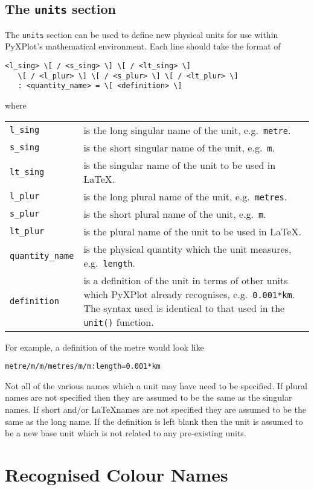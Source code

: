 \subsection{The {\tt units} section}
\label{sec:configfile_units}

The {\tt units} section can be used to define new physical units for use within
PyXPlot's mathematical environment. Each line should take the format of
\begin{verbatim}
<l_sing> \[ / <s_sing> \] \[ / <lt_sing> \] 
   \[ / <l_plur> \] \[ / <s_plur> \] \[ / <lt_plur> \]
   : <quantity_name> = \[ <definition> \]
\end{verbatim}
where
\begin{longtable}{p{3.4cm}p{9cm}}
{\tt l\_sing} & is the long singular name of the unit, e.g.\ {\tt metre}.\\
{\tt s\_sing} & is the short singular name of the unit, e.g.\ {\tt m}.\\
{\tt lt\_sing} & is the singular name of the unit to be used in \LaTeX.\\
{\tt l\_plur} & is the long plural name of the unit, e.g.\ {\tt metres}.\\
{\tt s\_plur} & is the short plural name of the unit, e.g.\ {\tt m}.\\
{\tt lt\_plur} & is the plural name of the unit to be used in \LaTeX.\\
{\tt quantity\_name} & is the physical quantity which the unit measures, e.g.\ {\tt length}.\\
{\tt definition} & is a definition of the unit in terms of other units which
PyXPlot already recognises, e.g.\ {\tt 0.001*km}. The syntax used is identical
to that used in the {\tt unit()} function.\\
\end{longtable}
For example, a definition of the metre would look like
\begin{verbatim}
metre/m/m/metres/m/m:length=0.001*km
\end{verbatim}

Not all of the various names which a unit may have need to be specified. If
plural names are not specified then they are assumed to be the same as the
singular names. If short and/or \LaTeX names are not specified they are assumed
to be the same as the long name. If the definition is left blank then the unit
is assumed to be a new base unit which is not related to any pre-existing
units.

\section{Recognised Colour Names}
\label{sec:colour_names}

